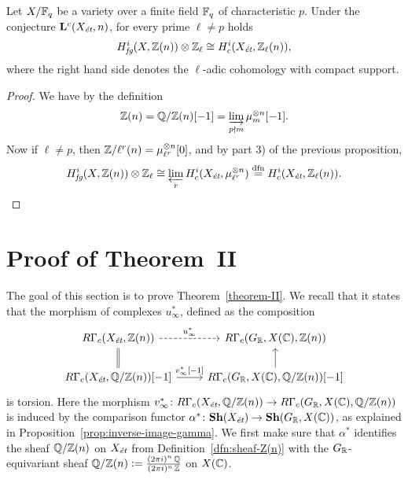 \documentclass{article}
\numberwithin{equation}{section}
\begin{document}
\begin{corollary}
  Let $X/\FF_q$ be a variety over a finite field $\FF_q$ of characteristic $p$.
  Under the conjecture $\mathbf{L}^c (X_\et, n)$, for every prime $\ell \ne p$
  holds
  $$H_\fg^i (X, \ZZ (n)) \otimes \ZZ_\ell \cong H^i_c (X_\et, \ZZ_\ell (n)),$$
  where the right hand side denotes the $\ell$-adic cohomology with compact
  support.

  \begin{proof}
    We have by the definition
    $$\ZZ (n) = \QQ/\ZZ (n) [-1] = \varinjlim_{p\nmid m} \mu_m^{\otimes n} [-1].$$
    Now if $\ell \ne p$, then $\ZZ/\ell^r (n) = \mu_{\ell^r}^{\otimes n} [0]$,
    and by part 3) of the previous proposition,
    \[ H_\fg^i (X, \ZZ (n)) \otimes \ZZ_\ell \cong
      \varprojlim_r H_c^i (X_\et, \mu_{\ell^r}^{\otimes n})
      \stackrel{\text{dfn}}{=} H_c^i (X_\et, \ZZ_\ell (n)). \qedhere \]
  \end{proof}
\end{corollary}


\section{Proof of Theorem~II}
\label{sec:theorem-II}

The goal of this section is to prove Theorem~\ref{theorem-II}. We recall that it
states that the morphism of complexes $u_\infty^*$, defined as the composition
\[ \begin{tikzcd}
  R\Gamma_c (X_\et, \ZZ(n)) \ar[equals]{d}\ar[dashed]{r}{u_\infty^*} & R\Gamma_c (G_\RR, X (\CC), \ZZ (n)) \\
  R\Gamma_c (X_\et, \QQ/\ZZ (n)) [-1] \ar{r}{v_\infty^* [-1]} & R\Gamma_c (G_\RR, X (\CC), \QQ/\ZZ (n)) [-1] \ar{u}
\end{tikzcd} \]
is torsion. Here the morphism
$v_\infty^*\colon R\Gamma_c (X_\et, \QQ/\ZZ (n)) \to R\Gamma_c (G_\RR, X (\CC), \QQ/\ZZ (n))$
is induced by the comparison functor
$\alpha^*\colon \mathbf{Sh} (X_\et) \to \mathbf{Sh} (G_\RR, X (\CC))$, as
explained in Proposition~\ref{prop:inverse-image-gamma}. We first make sure that
$\alpha^*$ identifies the sheaf $\QQ/\ZZ (n)$ on $X_\et$ from
Definition~\ref{dfn:sheaf-Z(n)} with the $G_\RR$-equivariant sheaf
$\QQ/\ZZ (n) \dfn \frac{(2\pi i)^n\,\QQ}{(2\pi i)^n\,\ZZ}$ on $X (\CC)$.
\end{document}
